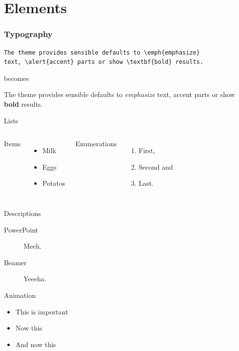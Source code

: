 \documentclass[10pt, compress]{beamer}
\begin{document}
\section{Elements}

\begin{frame}[fragile]
  \frametitle{Typography}
      \begin{verbatim}
The theme provides sensible defaults to \emph{emphasize}
text, \alert{accent} parts or show \textbf{bold} results.
      \end{verbatim}

  \begin{center}becomes\end{center}

  The theme provides sensible defaults to \emph{emphasize} text,
  \alert{accent} parts or show \textbf{bold} results.
\end{frame}
\begin{frame}{Lists}
  \begin{columns}[onlytextwidth]
      Items
      \begin{itemize}
        \item Milk \item Eggs \item Potatos
      \end{itemize}

      Enumerations
      \begin{enumerate}
        \item First, \item Second and \item Last.
      \end{enumerate}
  \end{columns}
\end{frame}
\begin{frame}{Descriptions}
  \begin{description}
    \item[PowerPoint] Meeh.
    \item[Beamer] Yeeeha.
  \end{description}
\end{frame}
\begin{frame}{Animation}
  \begin{itemize}[<+- | alert@+>]
    \item \alert<4>{This is important}
    \item Now this
    \item And now this
  \end{itemize}
\end{frame}
\end{document}
